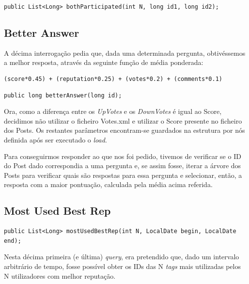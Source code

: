 \documentclass[a4paper, 11pt, oneside]{article}
\begin{document}
\begin{lstlisting}
public List<Long> bothParticipated(int N, long id1, long id2);
\end{lstlisting}


\subsection{Better Answer}

A décima interrogação pedia que, dada uma determinada pergunta, obtivéssemos a melhor resposta, através da seguinte função de média ponderada:

\begin{verbatim}
(score*0.45) + (reputation*0.25) + (votes*0.2) + (comments*0.1)
\end{verbatim}

\begin{lstlisting}
public long betterAnswer(long id);
\end{lstlisting}

Ora, como a diferença entre os \textit{UpVotes} e os \textit{DownVotes} é igual ao Score, decidimos não utilizar o ficheiro Votes.xml e utilizar o Score presente no 
ficheiro dos Posts. Os restantes parâmetros encontram-se guardados na estrutura por nós definida após ser executado o \textit{load}.

Para conseguirmos responder ao que nos foi pedido, tivemos de verificar se o ID do Post dado correspondia a uma pergunta e, se assim fosse, iterar a árvore dos Posts 
para verificar quais são respostas para essa pergunta e selecionar, então, a resposta com a maior pontuação, calculada pela média acima referida.


\subsection{Most Used Best Rep}

\begin{lstlisting}
public List<Long> mostUsedBestRep(int N, LocalDate begin, LocalDate end);
\end{lstlisting}

Nesta décima primeira (e última) \textit{query}, era pretendido que, dado um intervalo arbitrário de tempo, fosse possível obter os IDs das N \textit{tags} mais 
utilizadas pelos N utilizadores com melhor reputação.





\end{document}
